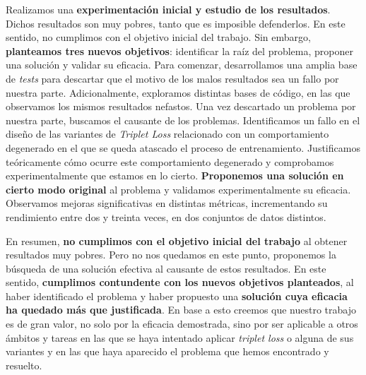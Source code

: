 Realizamos una \textbf{experimentación inicial y estudio de los resultados}. Dichos resultados son muy pobres, tanto que es imposible defenderlos. En este sentido, no cumplimos con el objetivo inicial del trabajo. Sin embargo, \textbf{planteamos tres nuevos objetivos}: identificar la raíz del problema, proponer una solución y validar su eficacia. Para comenzar, desarrollamos una amplia base de \textit{tests} para descartar que el motivo de los malos resultados sea un fallo por nuestra parte. Adicionalmente, exploramos distintas bases de código, en las que observamos los mismos resultados nefastos. Una vez descartado un problema por nuestra parte, buscamos el causante de los problemas. Identificamos un fallo en el diseño de las variantes de \textit{Triplet Loss} relacionado con un comportamiento degenerado en el que se queda atascado el proceso de entrenamiento. Justificamos teóricamente cómo ocurre este comportamiento degenerado y comprobamos experimentalmente que estamos en lo cierto. \textbf{Proponemos una solución en cierto modo original} al problema y validamos experimentalmente su eficacia. Observamos mejoras significativas en distintas métricas, incrementando su rendimiento entre dos y treinta veces, en dos conjuntos de datos distintos.

En resumen, \textbf{no cumplimos con el objetivo inicial del trabajo} al obtener resultados muy pobres. Pero no nos quedamos en este punto, proponemos la búsqueda de una solución efectiva al causante de estos resultados. En este sentido, \textbf{cumplimos contundente con los nuevos objetivos planteados}, al haber identificado el problema y haber propuesto una \textbf{solución cuya eficacia ha quedado más que justificada}. En base a esto creemos que nuestro trabajo es de gran valor, no solo por la eficacia demostrada, sino por ser aplicable a otros ámbitos y tareas en las que se haya intentado aplicar \textit{triplet loss} o alguna de sus variantes y en las que haya aparecido el problema que hemos encontrado y resuelto.

\endinput
